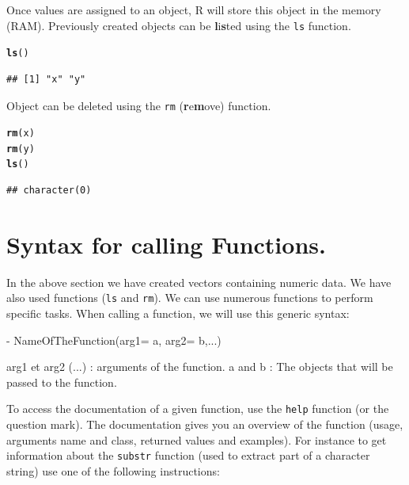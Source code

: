 \documentclass[10pt]{article}\usepackage[]{graphicx}\usepackage[]{color}
\makeatletter
\newcommand{\hlstd}[1]{\textcolor[rgb]{0.345,0.345,0.345}{#1}}%
\newcommand{\hlkwd}[1]{\textcolor[rgb]{0.737,0.353,0.396}{\textbf{#1}}}%
\newenvironment{kframe}{%
 \def\at@end@of@kframe{}%
 \ifinner\ifhmode%
  \def\at@end@of@kframe{\end{minipage}}%
  \begin{minipage}{\columnwidth}%
 \fi\fi%
 \def\FrameCommand##1{\hskip\@totalleftmargin \hskip-\fboxsep
 \colorbox{shadecolor}{##1}\hskip-\fboxsep
     \hskip-\linewidth \hskip-\@totalleftmargin \hskip\columnwidth}%
 \MakeFramed {\advance\hsize-\width
   \@totalleftmargin\z@ \linewidth\hsize
   \@setminipage}}%
 {\par\unskip\endMakeFramed%
 \at@end@of@kframe}
\newenvironment{knitrout}{}{} %
\newcommand{\Rfunction}[1]{{\texttt{#1}}}
\makeatother
\begin{document}
\medskip

Once values are assigned to an object, R will store this object in the memory (RAM). Previously created objects can be \textbf{l}i\textbf{s}ted using the \Rfunction{ls} function.
\begin{knitrout}
\color{fgcolor}\begin{kframe}
\begin{alltt}
\hlkwd{ls}\hlstd{()}
\end{alltt}
\begin{verbatim}
## [1] "x" "y"
\end{verbatim}
\end{kframe}
\end{knitrout}
\medskip

Object can be deleted using the \Rfunction{rm} (\textbf{r}e\textbf{m}ove) function.
\begin{knitrout}
\color{fgcolor}\begin{kframe}
\begin{alltt}
\hlkwd{rm}\hlstd{(x)}
\hlkwd{rm}\hlstd{(y)}
\hlkwd{ls}\hlstd{()}
\end{alltt}
\begin{verbatim}
## character(0)
\end{verbatim}
\end{kframe}
\end{knitrout}

 \medskip

\section{Syntax for calling Functions.}

In the above section we have created vectors containing  numeric data. We have also used functions (\Rfunction{ls} and \Rfunction{rm}). We can use numerous functions to perform specific tasks. When calling a function, we will use this generic syntax:

\begin{center}
\begin{Sinput}
 - NameOfTheFunction(arg1= a, arg2= b,...)
\end{Sinput}
\end{center}
\medskip
arg1 et arg2 (...) : arguments of the function.\medskip
a and b : The objects that will be passed to the function.
\medskip

To access the documentation of a given function, use the \Rfunction{help} function (or the question mark). The documentation gives you an overview of the function (usage, arguments name and class, returned values and examples). For instance to get information about the \Rfunction{substr} function (used to extract part of a character string) use one of the following instructions:
\end{document}
